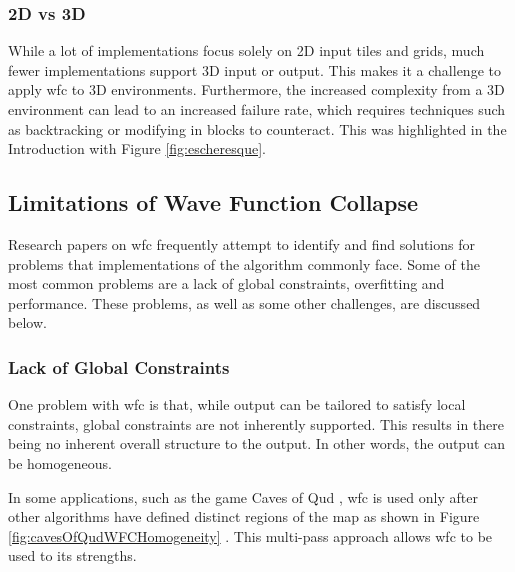 \subsubsection{2D vs 3D}
While a lot of implementations focus solely on 2D input tiles and grids, much fewer implementations support 3D input or output. This makes it a challenge to apply \acrshort{wfc} to 3D environments. Furthermore, the increased complexity from a 3D environment can lead to an increased failure rate, which requires techniques such as backtracking or modifying in blocks to counteract. This was highlighted in the Introduction with Figure \ref{fig:escheresque}.

\subsection{Limitations of Wave Function Collapse}
Research papers on \acrshort{wfc} frequently attempt to identify and find solutions for problems that implementations of the algorithm commonly face. Some of the most common problems are a lack of global constraints, overfitting and performance. These problems, as well as some other challenges, are discussed below.


\subsubsection{Lack of Global Constraints}
One problem with \acrshort{wfc} is that, while output can be tailored to satisfy local constraints, global constraints are not inherently supported. This results in there being no inherent overall structure to the output. In other words, the output can be homogeneous.

In some applications, such as the game Caves of Qud \cite{cavesofqud}, \acrshort{wfc} is used only after other algorithms have defined distinct regions of the map as shown in Figure \ref{fig:cavesOfQudWFCHomogeneity} \cite{WFC_ConstraintSolving_and_ML, WFC_Design_Constraints, GDC_caves_of_qud}. This multi-pass approach allows \acrshort{wfc} to be used to its strengths.

